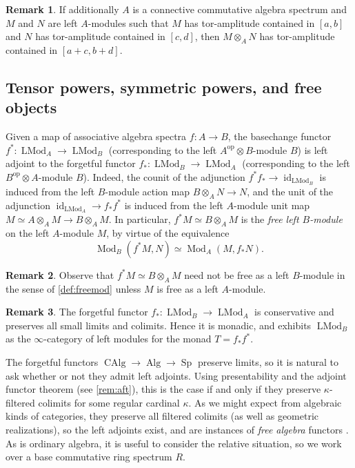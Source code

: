 \documentclass{article}
\theoremstyle{definition}
\newtheorem{remark}{Remark}[subsection]
\renewcommand{\i}{\infty}
\newcommand{\op}{\mathrm{op}}
\DeclareMathOperator{\LMod}{LMod}
\DeclareMathOperator{\Mod}{Mod}
\DeclareMathOperator{\Alg}{Alg}
\DeclareMathOperator{\CAlg}{CAlg}
\DeclareMathOperator{\id}{id}
\DeclareMathOperator{\Sp}{Sp}
\begin{document}
\begin{remark}
If additionally $A$ is a connective commutative algebra spectrum and $M$ and $N$ are left $A$-modules such that $M$ has tor-amplitude contained in $[a,b]$ and $N$ has tor-amplitude contained in $[c,d]$, then   $M\otimes_A N$ has tor-amplitude contained in $[a+c,b+d]$.
\end{remark}

\subsection{Tensor powers, symmetric powers, and free objects}


Given a map of associative algebra spectra $f:A\to B$, the basechange functor $f^*:\LMod_A\to\LMod_B$ (corresponding to the left $A^{\op}\otimes B$-module $B$) is left adjoint to the forgetful functor $f_*:\LMod_B\to\LMod_A$ (corresponding to the left $B^{\op}\otimes A$-module $B$).
Indeed, the counit of the adjunction $f^*f_*\to\id_{\LMod_B}$ is induced from the left $B$-module action map $B\otimes_A N\to N$, and the unit of the adjunction $\id_{\LMod_A}\to f_*f^*$ is induced from the left $A$-module unit map $M\simeq A\otimes_A M\to B\otimes_A M$.
In particular, $f^*M\simeq B\otimes_A M$ is the {\em free left $B$-module} on the left $A$-module $M$, by virtue of the equivalence
\[
\Mod_B(f^*M,N)\simeq\Mod_A(M,f_*N).
\]
\begin{remark}
Observe that $f^*M\simeq B\otimes_A M$ need not be free as a left $B$-module in the sense of \autoref{def:freemod} unless $M$ is free as a left $A$-module.
\end{remark}
\begin{remark}
The forgetful functor $f_*:\LMod_B\to\LMod_A$ is conservative and preserves all small limits and colimits.
Hence it is monadic, and exhibits $\LMod_B$ as the $\i$-category of left modules for the monad $T=f_* f^*$.
\end{remark}

The forgetful functors $\CAlg\to\Alg\to\Sp$ preserve limits, so it is natural to ask whether or not they admit left adjoints.
Using presentability and the adjoint functor theorem (see \autoref{rem:aft}), this is the case if and only if they preserve $\kappa$-filtered colimits for some regular cardinal $\kappa$.
As we might expect from algebraic kinds of categories, they preserve all filtered colimits (as well as geometric realizations), so the left adjoints exist, and are instances of {\em free algebra} functors \cite{HA}.
As is ordinary algebra, it is useful to consider the relative situation, so we work over a base commutative ring spectrum $R$.
\end{document}
